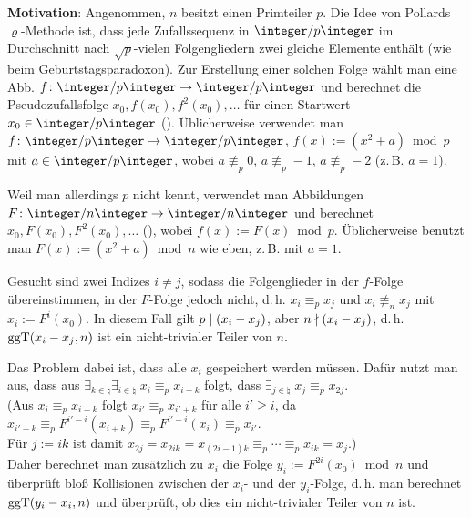 \linie

\textbf{Motivation}:
Angenommen, $n$ besitzt einen Primteiler $p$.
Die Idee von Pollards $\varrho$-Methode ist, dass jede Zufallssequenz in $\ZpZ$ im Durchschnitt
nach $\sqrt{p}$-vielen Folgengliedern zwei gleiche Elemente enthält
(wie beim Geburtstagsparadoxon).
Zur Erstellung einer solchen Folge wählt man eine Abb. $f\colon \ZpZ \rightarrow \ZpZ$
und berechnet die Pseudozufallsfolge
$x_0, f(x_0), f^2(x_0), \dotsc$ für einen Startwert $x_0 \in \ZpZ$
().
Üblicherweise verwendet man $f\colon \ZpZ \rightarrow \ZpZ$,
$f(x) := (x^2 + a) \bmod p$ mit $a \in \ZpZ$, wobei $a \not\equiv_p 0$, $a \not\equiv_p -1$,
$a \not\equiv_p -2$
(z.\,B. $a = 1$).

Weil man allerdings $p$ nicht kennt, verwendet man Abbildungen $F\colon \ZnZ \rightarrow \ZnZ$
und berechnet $x_0, F(x_0), F^2(x_0), \dotsc$ (),
wobei $f(x) := F(x) \bmod p$.
Üblicherweise benutzt man $F(x) := (x^2 + a) \bmod n$ wie eben, z.\,B. mit $a = 1$.

Gesucht sind zwei Indizes $i \not= j$, sodass die Folgenglieder in der $f$-Folge übereinstimmen,
in der $F$-Folge jedoch nicht,
d.\,h. $x_i \equiv_p x_j$ und $x_i \not\equiv_n x_j$ mit $x_i := F^i(x_0)$.
In diesem Fall gilt $p \mid (x_i - x_j)$, aber $n \nmid (x_i - x_j)$,
d.\,h. $\operatorname{ggT}(x_i - x_j, n)$ ist ein nicht-trivialer Teiler von $n$.


Das Problem dabei ist, dass alle $x_i$ gespeichert werden müssen.
Dafür nutzt man aus, dass aus
$\exists_{k \in \natural} \exists_{i \in \natural}\; x_i \equiv_p x_{i+k}$ folgt,
dass $\exists_{j \in \natural}\; x_j \equiv_p x_{2j}$.\\
(Aus $x_i \equiv_p x_{i+k}$ folgt $x_{i'} \equiv_p x_{i'+k}$ für alle $i' \ge i$,
da $x_{i'+k} \equiv_p F^{i'-i}(x_{i+k}) \equiv_p F^{i'-i}(x_i) \equiv_p x_{i'}$.\\
Für $j := ik$ ist damit
$x_{2j} = x_{2ik} = x_{(2i-1)k} \equiv_p \dotsb \equiv_p x_{ik} = x_j$.)\\
Daher berechnet man zusätzlich zu $x_i$ die Folge $y_i := F^{2i}(x_0) \bmod n$
und überprüft bloß Kollisionen zwischen der $x_i$- und der $y_i$-Folge,
d.\,h. man berechnet $\operatorname{ggT}(y_i - x_i, n)$ und überprüft, ob dies ein nicht-trivialer Teiler von $n$
ist.

